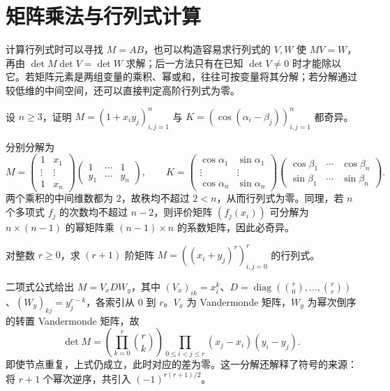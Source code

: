 \section{矩阵乘法与行列式计算}
\label{sec:matrix-factor-determinant}

计算行列式时可以寻找 $M=AB$，也可以构造容易求行列式的 $V,W$ 使 $MV=W$，再由 $\det M\det V=\det W$ 求解；后一方法只有在已知 $\det V\ne0$ 时才能除以它。若矩阵元素是两组变量的乘积、幂或和，往往可按变量将其分解；若分解通过较低维的中间空间，还可以直接判定高阶行列式为零。

\begin{example}
\label{ex:matrix-low-rank-factor}
设 $n\ge3$，证明 $M=(1+x_iy_j)_{i,j=1}^n$ 与 $K=(\cos(\alpha_i-\beta_j))_{i,j=1}^n$ 都奇异。
\end{example}
\begin{solve}
分别分解为
\[
 M=\begin{pmatrix}1&x_1\\\vdots&\vdots\\1&x_n\end{pmatrix}
 \begin{pmatrix}1&\cdots&1\\y_1&\cdots&y_n\end{pmatrix},\qquad
 K=\begin{pmatrix}\cos\alpha_1&\sin\alpha_1\\\vdots&\vdots\\\cos\alpha_n&\sin\alpha_n\end{pmatrix}
 \begin{pmatrix}\cos\beta_1&\cdots&\cos\beta_n\\\sin\beta_1&\cdots&\sin\beta_n\end{pmatrix}.
\]
两个乘积的中间维数都为 $2$，故秩均不超过 $2<n$，从而行列式为零。同理，若 $n$ 个多项式 $f_j$ 的次数均不超过 $n-2$，则评价矩阵 $(f_j(x_i))$ 可分解为 $n\times(n-1)$ 的幂矩阵乘 $(n-1)\times n$ 的系数矩阵，因此必奇异。
\end{solve}

\begin{example}
\label{ex:matrix-binomial-determinant}
对整数 $r\ge0$，求 $(r+1)$ 阶矩阵 $M=((x_i+y_j)^r)_{i,j=0}^r$ 的行列式。
\end{example}
\begin{solve}
二项式公式给出 $M=V_xDW_y$，其中 $(V_x)_{ik}=x_i^k$、$D=\operatorname{diag}(\binom r0,\ldots,\binom rr)$、$(W_y)_{kj}=y_j^{r-k}$，各索引从 $0$ 到 $r$。$V_x$ 为 Vandermonde 矩阵，$W_y$ 为幂次倒序的转置 Vandermonde 矩阵，故
\begin{equation}
 \det M=\left(\prod_{k=0}^r\binom rk\right)
 \prod_{0\le i<j\le r}(x_j-x_i)(y_i-y_j).
 \label{eq:matrix-binomial-determinant}
\end{equation}
即使节点重复，上式仍成立，此时对应的差为零。这一分解还解释了符号的来源：将 $r+1$ 个幂次逆序，共引入 $(-1)^{r(r+1)/2}$。
\end{solve}

